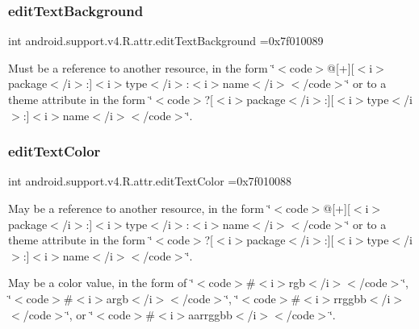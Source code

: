 \subsubsection{\texorpdfstring{edit\+Text\+Background}{editTextBackground}}
{\footnotesize\ttfamily int android.\+support.\+v4.\+R.\+attr.\+edit\+Text\+Background =0x7f010089\hspace{0.3cm}{\ttfamily [static]}}

Must be a reference to another resource, in the form \char`\"{}$<$code$>$@\mbox{[}+\mbox{]}\mbox{[}$<$i$>$package$<$/i$>$\+:\mbox{]}$<$i$>$type$<$/i$>$\+:$<$i$>$name$<$/i$>$$<$/code$>$\char`\"{} or to a theme attribute in the form \char`\"{}$<$code$>$?\mbox{[}$<$i$>$package$<$/i$>$\+:\mbox{]}\mbox{[}$<$i$>$type$<$/i$>$\+:\mbox{]}$<$i$>$name$<$/i$>$$<$/code$>$\char`\"{}. \mbox{\label{classandroid_1_1support_1_1v4_1_1R_1_1attr_a1b8c77d88fd0903a7e6138e4e35cf69e}} 
\subsubsection{\texorpdfstring{edit\+Text\+Color}{editTextColor}}
{\footnotesize\ttfamily int android.\+support.\+v4.\+R.\+attr.\+edit\+Text\+Color =0x7f010088\hspace{0.3cm}{\ttfamily [static]}}

May be a reference to another resource, in the form \char`\"{}$<$code$>$@\mbox{[}+\mbox{]}\mbox{[}$<$i$>$package$<$/i$>$\+:\mbox{]}$<$i$>$type$<$/i$>$\+:$<$i$>$name$<$/i$>$$<$/code$>$\char`\"{} or to a theme attribute in the form \char`\"{}$<$code$>$?\mbox{[}$<$i$>$package$<$/i$>$\+:\mbox{]}\mbox{[}$<$i$>$type$<$/i$>$\+:\mbox{]}$<$i$>$name$<$/i$>$$<$/code$>$\char`\"{}. 

May be a color value, in the form of \char`\"{}$<$code$>$\#$<$i$>$rgb$<$/i$>$$<$/code$>$\char`\"{}, \char`\"{}$<$code$>$\#$<$i$>$argb$<$/i$>$$<$/code$>$\char`\"{}, \char`\"{}$<$code$>$\#$<$i$>$rrggbb$<$/i$>$$<$/code$>$\char`\"{}, or \char`\"{}$<$code$>$\#$<$i$>$aarrggbb$<$/i$>$$<$/code$>$\char`\"{}. \mbox{\label{classandroid_1_1support_1_1v4_1_1R_1_1attr_a2a44b95ba45feb6b9848f66f16044f7d}} 
